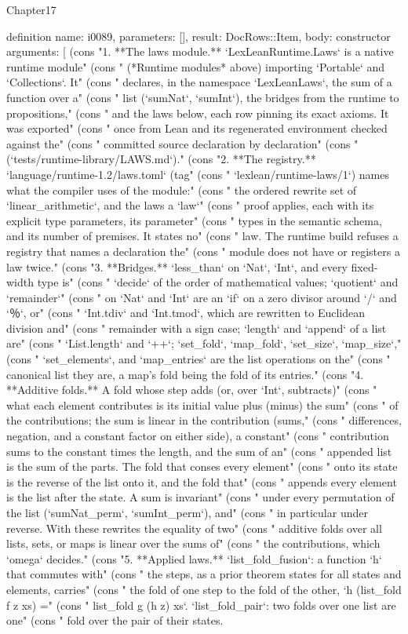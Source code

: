 \begin{lexlean}{Chapter17}
\begin{semanticmodule}
definition{
  name: i0089,
  parameters: [],
  result: DocRows::Item,
  body: constructor{
    arguments: [
      (cons "1. **The laws module.** `LexLeanRuntime.Laws` is a native runtime module" (cons "   (*Runtime modules* above) importing `Portable` and `Collections`. It" (cons "   declares, in the namespace `LexLeanLaws`, the sum of a function over a" (cons "   list (`sumNat`, `sumInt`), the bridges from the runtime to propositions," (cons "   and the laws below, each row pinning its exact axioms. It was exported" (cons "   once from Lean and its regenerated environment checked against the" (cons "   committed source declaration by declaration" (cons "   (`tests/runtime-library/LAWS.md`)." (cons "2. **The registry.** `language/runtime-1.2/laws.toml` (tag" (cons "   `lexlean/runtime-laws/1`) names what the compiler uses of the module:" (cons "   the ordered rewrite set of `linear_arithmetic`, and the laws a `law`" (cons "   proof applies, each with its explicit type parameters, its parameter" (cons "   types in the semantic schema, and its number of premises. It states no" (cons "   law. The runtime build refuses a registry that names a declaration the" (cons "   module does not have or registers a law twice." (cons "3. **Bridges.** `less_than` on `Nat`, `Int`, and every fixed-width type is" (cons "   `decide` of the order of mathematical values; `quotient` and `remainder`" (cons "   on `Nat` and `Int` are an `if` on a zero divisor around `/` and `％`, or" (cons "   `Int.tdiv` and `Int.tmod`, which are rewritten to Euclidean division and" (cons "   remainder with a sign case; `length` and `append` of a list are" (cons "   `List.length` and `++`; `set_fold`, `map_fold`, `set_size`, `map_size`," (cons "   `set_elements`, and `map_entries` are the list operations on the" (cons "   canonical list they are, a map's fold being the fold of its entries." (cons "4. **Additive folds.** A fold whose step adds (or, over `Int`, subtracts)" (cons "   what each element contributes is its initial value plus (minus) the sum" (cons "   of the contributions; the sum is linear in the contribution (sums," (cons "   differences, negation, and a constant factor on either side), a constant" (cons "   contribution sums to the constant times the length, and the sum of an" (cons "   appended list is the sum of the parts. The fold that conses every element" (cons "   onto its state is the reverse of the list onto it, and the fold that" (cons "   appends every element is the list after the state. A sum is invariant" (cons "   under every permutation of the list (`sumNat_perm`, `sumInt_perm`), and" (cons "   in particular under reverse. With these rewrites the equality of two" (cons "   additive folds over all lists, sets, or maps is linear over the sums of" (cons "   the contributions, which `omega` decides." (cons "5. **Applied laws.** `list_fold_fusion`: a function `h` that commutes with" (cons "   the steps, as a prior theorem states for all states and elements, carries" (cons "   the fold of one step to the fold of the other, `h (list_fold f z xs) =" (cons "   list_fold g (h z) xs`. `list_fold_pair`: two folds over one list are one" (cons "   fold over the pair of their states. }}
\end{semanticmodule}
\end{lexlean}
